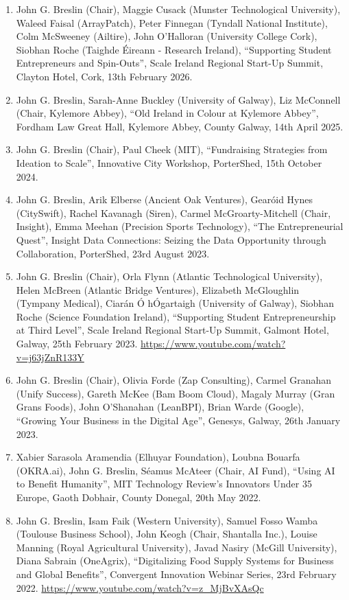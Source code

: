 \documentclass[10pt,a4paper]{res} %
\begin{document}
\begin{resume}
\begin{enumerate} \itemsep -2pt
\item John G. Breslin (Chair), Maggie Cusack (Munster Technological University), Waleed Faisal (ArrayPatch), Peter Finnegan (Tyndall National Institute), Colm McSweeney (Ailtire), John O'Halloran (University College Cork), Siobhan Roche (Taighde \'{E}ireann - Research Ireland), ``Supporting Student Entrepreneurs and Spin-Outs'', Scale Ireland Regional Start-Up Summit, Clayton Hotel, Cork, 13th February 2026.
\item John G. Breslin, Sarah-Anne Buckley (University of Galway), Liz McConnell (Chair, Kylemore Abbey), ``Old Ireland in Colour at Kylemore Abbey'', Fordham Law Great Hall, Kylemore Abbey, County Galway, 14th April 2025.
\item John G. Breslin (Chair), Paul Cheek (MIT), ``Fundraising Strategies from Ideation to Scale'', Innovative City Workshop, PorterShed, 15th October 2024.
\item John G. Breslin, Arik Elberse (Ancient Oak Ventures), Gear\'{o}id Hynes (CitySwift), Rachel Kavanagh (Siren), Carmel McGroarty-Mitchell (Chair, Insight), Emma Meehan (Precision Sports Technology), ``The Entrepreneurial Quest'', Insight Data Connections: Seizing the Data Opportunity through Collaboration, PorterShed, 23rd August 2023.
\item John G. Breslin (Chair), Orla Flynn (Atlantic Technological University), Helen McBreen (Atlantic Bridge Ventures), Elizabeth McGloughlin (Tympany Medical), Ciar\'{a}n \'{O} h\'{O}gartaigh (University of Galway), Siobhan Roche (Science Foundation Ireland), ``Supporting Student Entrepreneurship at Third Level'', Scale Ireland Regional Start-Up Summit, Galmont Hotel, Galway, 25th February 2023. \url{https://www.youtube.com/watch?v=j63jZnR133Y}
\item John G. Breslin (Chair), Olivia Forde (Zap Consulting), Carmel Granahan (Unify Success), Gareth McKee (Bam Boom Cloud), Magaly Murray (Gran Grans Foods), John O'Shanahan (LeanBPI), Brian Warde (Google), ``Growing Your Business in the Digital Age'', Genesys, Galway, 26th January 2023.
\item Xabier Sarasola Aramendia (Elhuyar Foundation), Loubna Bouarfa (OKRA.ai), John G. Breslin, S\'{e}amus McAteer (Chair, AI Fund), ``Using AI to Benefit Humanity'', MIT Technology Review's Innovators Under 35 Europe, Gaoth Dobhair, County Donegal, 20th May 2022. %
\item John G. Breslin, Isam Faik (Western University), Samuel Fosso Wamba (Toulouse Business School), John Keogh (Chair, Shantalla Inc.), Louise Manning (Royal Agricultural University), Javad Nasiry (McGill University), Diana Sabrain (OneAgrix), ``Digitalizing Food Supply Systems for Business and Global Benefits'', Convergent Innovation Webinar Series, 23rd February 2022. \url{https://www.youtube.com/watch?v=z_MjBvXAsQc} %

\end{enumerate}
\end{resume}
\end{document}
